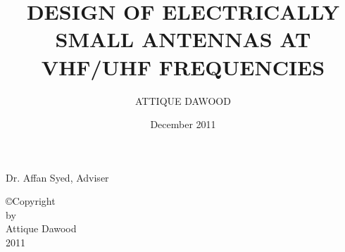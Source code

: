 \documentclass[12pt]{report}
\begin{document}

\setcounter{tocdepth}{2}


\title{DESIGN OF ELECTRICALLY SMALL ANTENNAS AT VHF/UHF FREQUENCIES}

\author{ATTIQUE DAWOOD}
\date{December 2011}

                {Dr. Affan Syed, Adviser}


\makesigpage

\begin{CenteredPage}
\copyright Copyright\\[0.2in]
by\\[0.2in]
Attique Dawood\\[0.2in]
2011
\end{CenteredPage}

\end{document}
